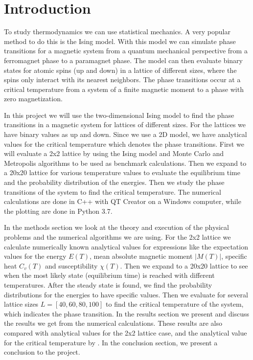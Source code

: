 \documentclass[12pt,a4paper,english]{article}
\begin{document}
\section{Introduction}
\label{sect:Introduction}
To study thermodynamics we can use statistical mechanics. A very popular method to do this is the Ising model. With this model we can simulate phase transitions for a magnetic system from a quantum mechanical perspective from a ferromagnet phase to a paramagnet phase. The model can then evaluate binary states for atomic spins (up and down) in a lattice of different sizes, where the spins only interact with its nearest neighbors. The phase transitions occur at a critical temperature from a system of a finite magnetic moment to a phase with zero magnetization.

In this project we will use the two-dimensional Ising model to find the phase transitions in a magnetic system for lattices of different sizes. For the lattices we have binary values as up and down. Since we use a 2D model, we have analytical values for the critical temperature which denotes the phase transitions. First we will evaluate a 2x2 lattice by using the Ising model and Monte Carlo and Metropolis algorithms to be used as benchmark calculations. Then we expand to a 20x20 lattice for various temperature values to evaluate the equilibrium time and the probability distribution of the energies. Then we study the phase transitions of the system to find the critical temperature. The numerical calculations are done in C++ with QT Creator on a Windows computer, while the plotting are done in Python 3.7.

In the methods section we look at the theory and execution of the physical problems and the numerical algorithms we are using. For the 2x2 lattice we calculate numerically known analytical values for expressions like the expectation values for the energy $E(T)$, mean absolute magnetic moment $|M(T)|$, specific heat $C_v(T)$ and susceptibility $\chi(T)$. Then we expand to a 20x20 lattice to see when the most likely state (equilibrium time) is reached with different temperatures. After the steady state is found, we find the probability distributions for the energies to have specific values. Then we evaluate for several lattice sizes $L=[40,60,80,100]$ to find the critical temperature of the system, which indicates the phase transition. In the results section we present and discuss the results we get from the numerical calculations. These results are also compared with analytical values for the 2x2 lattice case, and the analytical value for the critical temperature by \citet{PhysRev.65.117}. In the conclusion section, we present a conclusion to the project.
\end{document}
